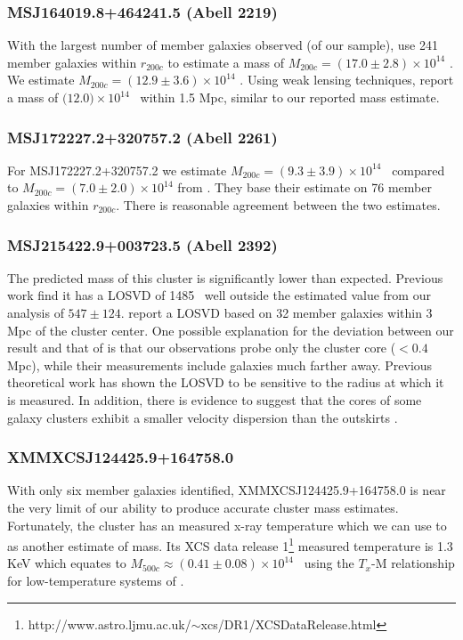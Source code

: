 \subsubsection{MSJ164019.8+464241.5 (Abell 2219)}
With the largest number of member galaxies observed (of our sample), \cite{Sifon2015} use 241 member galaxies within $r_{200c}$ to estimate a mass of $M_{200c} = (17.0\pm2.8)\times 10^{14}$ \Msol. We estimate $M_{200c} = (12.9\pm3.6)\times 10^{14}$ \Msol. Using weak lensing techniques, \cite{Applegate2014} report a mass of $(12.0$$)\times 10^{14}$ \Msol\ within 1.5 Mpc, similar to our reported mass estimate.

\subsubsection{MSJ172227.2+320757.2 (Abell 2261)}
For MSJ172227.2+320757.2 we estimate $M_{200c} = (9.3\pm3.9)\times 10^{14}$ \Msol\ compared to $M_{200c} = (7.0\pm2.0)\times 10^{14}$ \Msol from \cite{Sifon2015}. They base their estimate on 76 member galaxies within $r_{200c}$. There is reasonable agreement between the two estimates.

\subsubsection{MSJ215422.9+003723.5 (Abell 2392)}\label{2sec: Abell2392}
The predicted mass of this cluster is significantly lower than expected. Previous work \citep{Wing2013} find it has a LOSVD of 1485 \kms\ well outside the estimated value from our analysis of $547\pm124$. \cite{Wing2013} report a LOSVD based on 32 member galaxies within 3 Mpc of the cluster center. One possible explanation for the deviation between our result and that of \cite{Wing2013} is that our observations probe only the cluster core ($<0.4$ Mpc), while their measurements include galaxies much farther away. Previous theoretical work  has shown the LOSVD to be sensitive to the radius at which it is measured. In addition, there is evidence to suggest that the cores of some galaxy clusters exhibit a smaller velocity dispersion than the outskirts .

\subsubsection{XMMXCSJ124425.9+164758.0}
With only six member galaxies identified, XMMXCSJ124425.9+164758.0 is near the very limit of our ability to produce accurate cluster mass estimates. Fortunately, the cluster has an measured x-ray temperature which we can use to as another estimate of mass. Its XCS data release 1\footnote{http://www.astro.ljmu.ac.uk/$\sim$xcs/DR1/XCSDataRelease.html} \citep{Mehrtens2012} measured temperature is 1.3 KeV which equates to $M_{500c}\approx(0.41\pm0.08)\times10^{14}$ \Msol\ using the $T_x$-M relationship for low-temperature systems of \cite{Finoguenov2001}.

